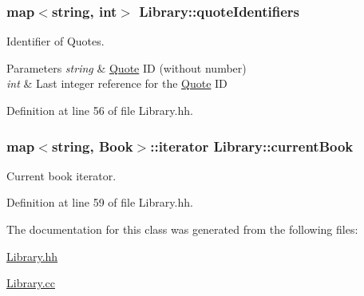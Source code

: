 \subsubsection[{\texorpdfstring{quote\+Identifiers}{quoteIdentifiers}}]{\setlength{\rightskip}{0pt plus 5cm}map$<$string, int$>$ Library\+::quote\+Identifiers\hspace{0.3cm}{\ttfamily [private]}}\hypertarget{class_library_a58c1f12a0278872cd0299e586551bb7a}{}\label{class_library_a58c1f12a0278872cd0299e586551bb7a}


Identifier of Quotes. 


\begin{DoxyParams}{Parameters}
{\em string} & \hyperlink{class_quote}{Quote} ID (without number) \\
\hline
{\em int} & Last integer reference for the \hyperlink{class_quote}{Quote} ID \\
\hline
\end{DoxyParams}


Definition at line 56 of file Library.\+hh.

\subsubsection[{\texorpdfstring{current\+Book}{currentBook}}]{\setlength{\rightskip}{0pt plus 5cm}map$<$string, {\bf Book}$>$\+::iterator Library\+::current\+Book\hspace{0.3cm}{\ttfamily [private]}}\hypertarget{class_library_a78a4071e8d610da671b3886c71900dae}{}\label{class_library_a78a4071e8d610da671b3886c71900dae}


Current book iterator. 



Definition at line 59 of file Library.\+hh.



The documentation for this class was generated from the following files\+:\begin{DoxyCompactItemize}
\item 
\hyperlink{_library_8hh}{Library.\+hh}\item 
\hyperlink{_library_8cc}{Library.\+cc}\end{DoxyCompactItemize}
